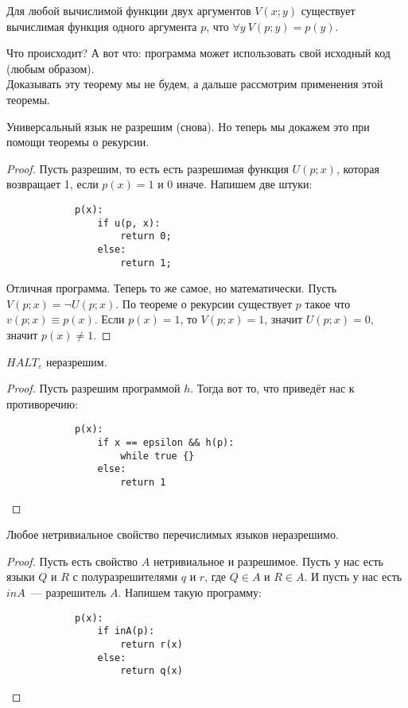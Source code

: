 \documentclass{article}
\begin{document}
    \begin{theorem}
        Для любой вычислимой функции двух аргументов $V(x;y)$ существует вычислимая функция одного аргумента $p$, что $\forall y~V(p;y)=p(y)$.
    \end{theorem}
    \begin{remark}
        Что происходит? А вот что: программа может использовать свой исходный код (любым образом).\\
        Доказывать эту теорему мы не будем, а дальше рассмотрим применения этой теоремы.
    \end{remark}
    \begin{theorem}
        Универсальный язык не разрешим (снова). Но теперь мы докажем это при помощи теоремы о рекурсии.
    \end{theorem}
    \begin{proof}
        Пусть разрешим, то есть есть разрешимая функция $U(p;x)$, которая возвращает 1, если $p(x)=1$ и 0 иначе. Напишем две штуки:
        \begin{verbatim}
            p(x):
                if u(p, x):
                    return 0;
                else:
                    return 1;
        \end{verbatim}
        Отличная программа. Теперь то же самое, но математически. Пусть $V(p;x)=\neg U(p;x)$. По теореме о рекурсии существует $p$ такое что $v(p;x)\equiv p(x)$. Если $p(x)=1$, то $V(p;x)=1$, значит $U(p;x)=0$, значит $p(x)\neq1$.
    \end{proof}
    \begin{theorem}
        $HALT_\varepsilon$ неразрешим.
    \end{theorem}
    \begin{proof}
        Пусть разрешим программой $h$. Тогда вот то, что приведёт нас к противоречию:
        \begin{verbatim}
            p(x):
                if x == epsilon && h(p):
                    while true {}
                else:
                    return 1
        \end{verbatim}
    \end{proof}
    \begin{theorem}
        Любое нетривиальное свойство перечислимых языков неразрешимо.
    \end{theorem}
    \begin{proof}
        Пусть есть свойство $A$ нетривиальное и разрешимое. Пусть у нас есть языки $Q$ и $R$ с полуразрешителями $q$ и $r$, где $Q\in A$ и $R\in A$. И пусть у нас есть $inA$~--- разрешитель $A$. Напишем такую программу:
        \begin{verbatim}
            p(x):
                if inA(p):
                    return r(x)
                else:
                    return q(x)
        \end{verbatim}
    \end{proof}
\end{document}
